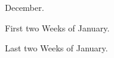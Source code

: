 \documentclass[]{final_report}
\begin{document}
\begin{figure}[h]
	\centering
	\fboxsep 2mm
	\caption{\label{fig:December} December.}
\end{figure}

\begin{figure}[h]
	\centering
	\fboxsep 2mm
	\caption{\label{fig:January1} First two Weeks of January.}
\end{figure}

\begin{figure}[h]
	\centering
	\fboxsep 2mm
	\caption{\label{fig:January2} Last two Weeks of January.}
\end{figure}
\end{document}
